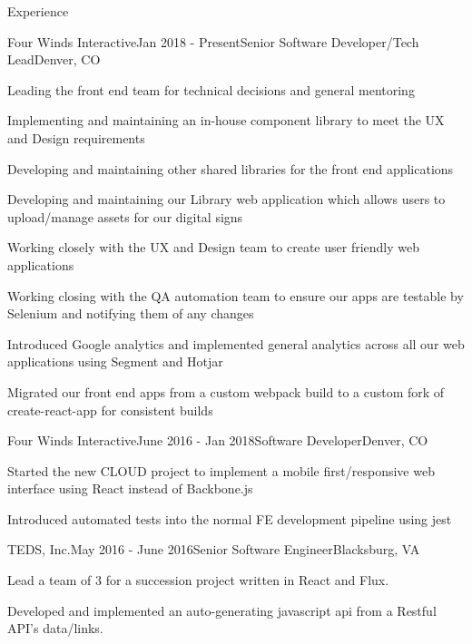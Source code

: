 \documentclass{resume} %
\begin{document}
\begin{rSection}{Experience}

\begin{rSubsection}{Four Winds Interactive}{Jan 2018 - Present}{Senior Software Developer/Tech Lead}{Denver, CO}
\item Leading the front end team for technical decisions and general mentoring
\item Implementing and maintaining an in-house component library to meet the UX and Design requirements
\item Developing and maintaining other shared libraries for the front end applications
\item Developing and maintaining our Library web application which allows users to upload/manage assets for our digital signs
\item Working closely with the UX and Design team to create user friendly web applications
\item Working closing with the QA automation team to ensure our apps are testable by Selenium and notifying them of any changes
\item Introduced Google analytics and implemented general analytics across all our web applications using Segment and Hotjar
\item Migrated our front end apps from a custom webpack build to a custom fork of create-react-app for consistent builds
\end{rSubsection}

\begin{rSubsection}{Four Winds Interactive}{June 2016 - Jan 2018}{Software Developer}{Denver, CO}
\item Started the new CLOUD project to implement a mobile first/responsive web interface using React instead of Backbone.js 
\item Introduced automated tests into the normal FE development pipeline using jest
\end{rSubsection}


\begin{rSubsection}{TEDS, Inc.}{May 2016 - June 2016}{Senior Software Engineer}{Blacksburg, VA}
\item Lead a team of 3 for a succession project written in React and Flux.
\item Developed and implemented an auto-generating javascript api from a Restful API's data/links.
\end{rSubsection}


\end{rSection}
\end{document}
